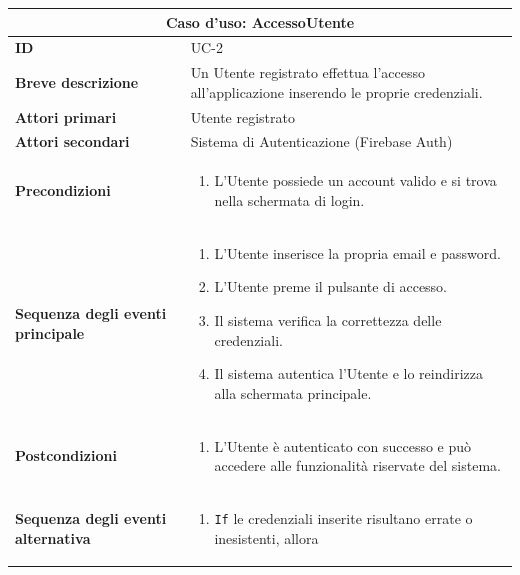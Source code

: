 \documentclass[a4paper]{report}
\begin{document}
\begin{table}[H]
\vspace*{-0cm}
\renewcommand{\arraystretch}{1.9}
\begin{tabular}{|p{3.9cm}|p{9.9cm}|}
\hline
\multicolumn{2}{|c|}{\textbf{Caso d’uso: AccessoUtente}} \\ \hline
\textbf{ID} & UC-2 \\ \hline
\textbf{Breve descrizione} & Un Utente registrato effettua l'accesso all'applicazione inserendo le proprie credenziali. \\ \hline
\textbf{Attori primari} & Utente registrato \\ \hline
\textbf{Attori secondari} & Sistema di Autenticazione (Firebase Auth) \\ \hline
\textbf{Precondizioni} & \begin{enumerate}[leftmargin=14pt,label=\arabic*.,labelsep=0.5em,topsep=0pt,partopsep=0pt,parsep=0pt,itemsep=0pt]
    \item L'Utente possiede un account valido e si trova nella schermata di login.
\end{enumerate} \\ \hline
\textbf{Sequenza degli eventi principale} &
\begin{enumerate}[leftmargin=14pt,label=\arabic*.,labelsep=0.5em,topsep=0pt,partopsep=0pt,parsep=0pt,itemsep=0pt]
   \item L'Utente inserisce la propria email e password.
   \item L'Utente preme il pulsante di accesso.
   \item Il sistema verifica la correttezza delle credenziali.
   \item Il sistema autentica l'Utente e lo reindirizza alla schermata principale.
\end{enumerate}\\ \hline
\textbf{Postcondizioni} &
\begin{enumerate}[leftmargin=14pt,label=\arabic*.,labelsep=0.5em,topsep=0pt,partopsep=0pt,parsep=0pt,itemsep=0pt]
\item L'Utente è autenticato con successo e può accedere alle funzionalità riservate del sistema.
\end{enumerate} \\ \hline
\textbf{Sequenza degli eventi alternativa} & \begin{enumerate}[leftmargin=14pt,label=\arabic*.,labelsep=0.5em,topsep=0pt,partopsep=0pt,parsep=0pt,itemsep=0pt]
   \item \texttt{If} le credenziali inserite risultano errate o inesistenti, allora

\end{enumerate}
\end{tabular}
\end{table}
\end{document}
